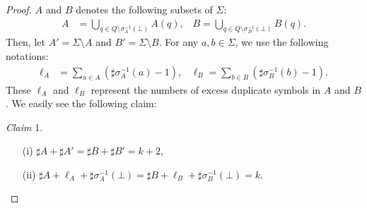\begin{proof}
$A$ and $B$ denotes the following subsets of $\Sigma$:
\begin{align*}
  A & = \bigcup_{q \in Q \setminus \sigma_{A}^{-1}(\bot)} A(q) \mbox{,~~~}
  B = \bigcup_{q \in Q \setminus \sigma_{B}^{-1}(\bot)} B(q).
\end{align*}
Then, let $A' = \Sigma \setminus A$ and $B' = \Sigma \setminus B$.
For any $a,b \in \Sigma$, we use the following notations:
\begin{align*}
  \ell_{A} &= \sum_{a \in A}(\sharp \sigma_{A}^{-1}(a) - 1) \mbox{,~~~}
  \ell_{B} = \sum_{b \in B}(\sharp \sigma_{B}^{-1}(b) - 1).
\end{align*}
These $\ell_{A}$ and $\ell_{B}$ represent the numbers of excess duplicate symbols in $A$ and $B$.
We easily see the following claim:  

\smallskip

\noindent
\textit{Claim} 1. 
\begin{enumerate}
  \item[(i)] $\sharp A + \sharp A' = \sharp B + \sharp B' = k + 2$,
  \item[(ii)] $\sharp A + \ell_{A} + \sharp \sigma_{A}^{-1}(\bot) = \sharp B + \ell_{B} + \sharp \sigma_{B}^{-1}(\bot) = k$.
\end{enumerate}

\smallskip


\end{proof}
